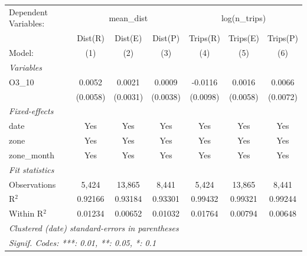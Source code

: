 \begingroup
\centering
\begin{tabular}{lcccccc}
   \tabularnewline \midrule \midrule
   Dependent Variables: & \multicolumn{3}{c}{mean\_dist} & \multicolumn{3}{c}{log(n\_trips)}\\
                & Dist(R)  & Dist(E)  & Dist(P)  & Trips(R) & Trips(E) & Trips(P) \\   
   Model:       & (1)      & (2)      & (3)      & (4)      & (5)      & (6)\\  
   \midrule
   \emph{Variables}\\
   O3\_10       & 0.0052   & 0.0021   & 0.0009   & -0.0116  & 0.0016   & 0.0066\\   
                & (0.0058) & (0.0031) & (0.0038) & (0.0098) & (0.0058) & (0.0072)\\   
   \midrule
   \emph{Fixed-effects}\\
   date         & Yes      & Yes      & Yes      & Yes      & Yes      & Yes\\  
   zone         & Yes      & Yes      & Yes      & Yes      & Yes      & Yes\\  
   zone\_month  & Yes      & Yes      & Yes      & Yes      & Yes      & Yes\\  
   \midrule
   \emph{Fit statistics}\\
   Observations & 5,424    & 13,865   & 8,441    & 5,424    & 13,865   & 8,441\\  
   R$^2$        & 0.92166  & 0.93184  & 0.93301  & 0.99432  & 0.99321  & 0.99244\\  
   Within R$^2$ & 0.01234  & 0.00652  & 0.01032  & 0.01764  & 0.00794  & 0.00648\\  
   \midrule \midrule
   \multicolumn{7}{l}{\emph{Clustered (date) standard-errors in parentheses}}\\
   \multicolumn{7}{l}{\emph{Signif. Codes: ***: 0.01, **: 0.05, *: 0.1}}\\
\end{tabular}
\par\endgroup
